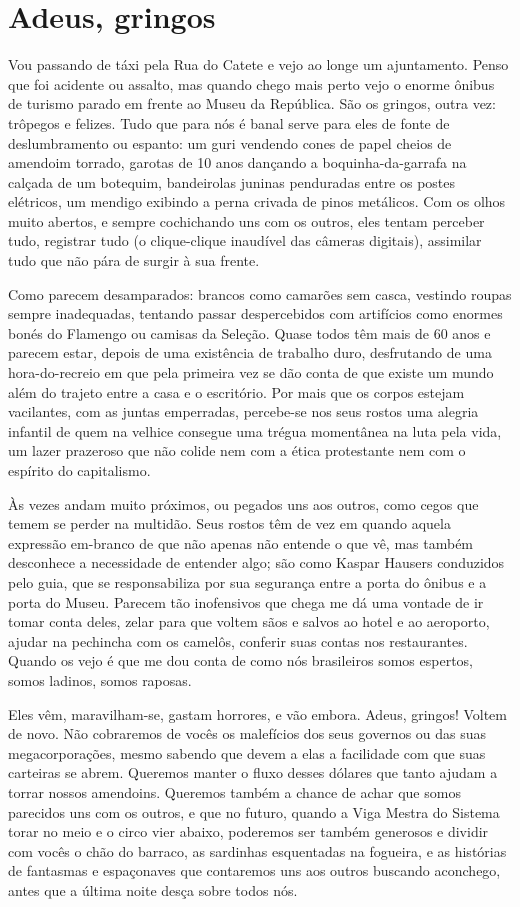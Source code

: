 \chapter{Adeus, gringos}

Vou passando de táxi pela Rua do Catete e vejo ao longe um
ajuntamento. Penso que foi acidente ou assalto, mas quando chego mais
perto vejo o enorme ônibus de turismo parado em frente ao Museu da
República. São os gringos, outra vez: trôpegos e felizes. Tudo que
para nós é banal serve para eles de fonte de deslumbramento ou
espanto: um guri vendendo cones de papel cheios de amendoim torrado,
garotas de 10 anos dançando a boquinha-da-garrafa na calçada de um
botequim, bandeirolas juninas penduradas entre os postes elétricos,
um mendigo exibindo a perna crivada de pinos metálicos. Com os olhos
muito abertos, e sempre cochichando uns com os outros, eles tentam
perceber tudo, registrar tudo (o clique-clique inaudível das câmeras
digitais), assimilar tudo que não pára de surgir à sua frente.

Como parecem desamparados: brancos como camarões sem casca, vestindo
roupas sempre inadequadas, tentando passar despercebidos com
artifícios como enormes bonés do Flamengo ou camisas da Seleção.
Quase todos têm mais de 60 anos e parecem estar, depois de uma
existência de trabalho duro, desfrutando de uma hora-do-recreio em
que pela primeira vez se dão conta de que existe um mundo além do
trajeto entre a casa e o escritório. Por mais que os corpos estejam
vacilantes, com as juntas emperradas, percebe-se nos seus rostos uma
alegria infantil de quem na velhice consegue uma trégua momentânea na
luta pela vida, um lazer prazeroso que não colide nem com a ética
protestante nem com o espírito do capitalismo.

Às vezes andam muito próximos, ou pegados uns aos outros, como cegos
que temem se perder na multidão. Seus rostos têm de vez em quando
aquela expressão em-branco de que não apenas não entende o que vê,
mas também desconhece a necessidade de entender algo; são como Kaspar
Hausers conduzidos pelo guia, que se responsabiliza por sua segurança
entre a porta do ônibus e a porta do Museu. Parecem tão inofensivos
que chega me dá uma vontade de ir tomar conta deles, zelar para que
voltem sãos e salvos ao hotel e ao aeroporto, ajudar na pechincha com
os camelôs, conferir suas contas nos restaurantes. Quando os vejo é
que me dou conta de como nós brasileiros somos espertos, somos
ladinos, somos raposas.

Eles vêm, maravilham-se, gastam horrores, e vão embora. Adeus,
gringos! Voltem de novo. Não cobraremos de vocês os malefícios dos
seus governos ou das suas megacorporações, mesmo sabendo que devem a
elas a facilidade com que suas carteiras se abrem. Queremos manter o
fluxo desses dólares que tanto ajudam a torrar nossos amendoins.
Queremos também a chance de achar que somos parecidos uns com os
outros, e que no futuro, quando a Viga Mestra do Sistema torar no
meio e o circo vier abaixo, poderemos ser também generosos e dividir
com vocês o chão do barraco, as sardinhas esquentadas na fogueira, e
as histórias de fantasmas e espaçonaves que contaremos uns aos outros
buscando aconchego, antes que a última noite desça sobre todos nós.

